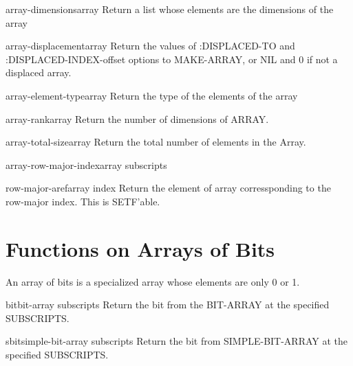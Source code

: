 \documentclass[10pt,english]{book}
\begin{document}
\begin{function}{array-dimensions}{array}
  Return a list whose elements are the dimensions of the array
\end{function}

\begin{function}{array-displacement}{array}
  Return the values of :DISPLACED-TO and :DISPLACED-INDEX-offset
   options to MAKE-ARRAY, or NIL and 0 if not a displaced array.
\end{function}

\begin{function}{array-element-type}{array}
  Return the type of the elements of the array
\end{function}

\begin{function}{array-rank}{array}
  Return the number of dimensions of ARRAY.
\end{function}

\begin{function}{array-total-size}{array}
  Return the total number of elements in the Array.
\end{function}

\begin{function}{array-row-major-index}{array \rest subscripts}
  
\end{function}

\begin{accessor}{row-major-aref}{array index}
  Return the element of array corressponding to the row-major index. This is
   SETF'able.
\end{accessor}

\section{Functions on Arrays of Bits}
\label{sec:funct-arrays-bits}

An array of bits is a specialized array whose elements are only 0 or
1.

\begin{accessor}{bit}{bit-array \rest subscripts}
  Return the bit from the BIT-ARRAY at the specified SUBSCRIPTS.
\end{accessor}

\begin{accessor}{sbit}{simple-bit-array \rest subscripts}
  Return the bit from SIMPLE-BIT-ARRAY at the specified SUBSCRIPTS.
\end{accessor}
\end{document}
